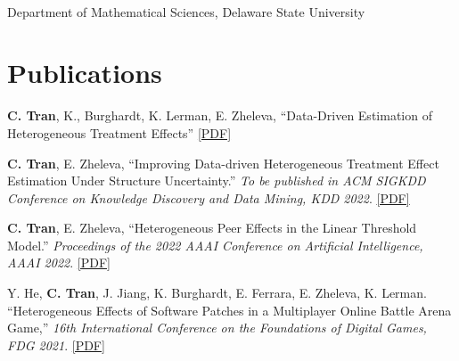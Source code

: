 \documentclass[mm]{simple_style}
\begin{document}
\begin{resume}
\\
Department of Mathematical Sciences, Delaware State University 

\vspace{-2ex}
\sectionline





\section{Publications}

\textbf{C. Tran}, K., Burghardt, K. Lerman, E. Zheleva, ``Data-Driven Estimation of Heterogeneous Treatment Effects'' \href{https://arxiv.org/pdf/2301.06615.pdf}{[PDF]}

\textbf{C. Tran}, E. Zheleva, ``Improving Data-driven Heterogeneous Treatment Effect Estimation Under Structure Uncertainty.'' \textit{To be published in ACM SIGKDD Conference on Knowledge Discovery and Data Mining, \textcolor{dorange}{KDD 2022}}. \href{https://dl.acm.org/doi/pdf/10.1145/3534678.3539444}{[PDF]}

\textbf{C. Tran}, E. Zheleva, ``Heterogeneous Peer Effects in the Linear Threshold Model.'' \textit{Proceedings of the 2022 AAAI Conference on Artificial Intelligence, \textcolor{dorange}{AAAI 2022}}. \href{https://ojs.aaai.org/index.php/AAAI/article/view/20336/20095}{[PDF]}

Y. He, \textbf{C. Tran}, J. Jiang, K. Burghardt, E. Ferrara, E. Zheleva, K. Lerman. ``Heterogeneous Effects of Software Patches in a Multiplayer Online Battle Arena Game,'' \textit{16th International Conference on the Foundations of Digital Games, \textcolor{dorange}{FDG 2021}}. \href{https://dl.acm.org/doi/pdf/10.1145/3472538.3472550}{[PDF]}


\end{resume}
\end{document}
